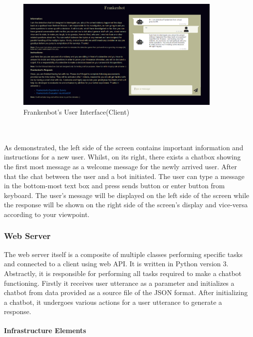 \begin{figure}[!h]
    \centering
    \includegraphics[width=0.9\textwidth]{img/User_Interface.PNG}
    \caption{Frankenbot's User Interface(Client)}
    \label{fig:userInter}
\end{figure}
\\~\\
As demonstrated, the left side of the screen contains important information and instructions for a new user. Whilst, on its right, there exists a chatbox showing the first most message as a welcome message for the newly arrived user. After that the chat between the user and a bot initiated. The user can type a message in the bottom-most text box and press sends button or enter button from keyboard. The user's message will be displayed on the left side of the screen while the response will be shown on the right side of the screen's display and vice-versa according to your viewpoint.

\subsubsection*{Web Server}
The web server itself is a composite of multiple classes performing specific tasks and connected to a client using web API. It is written in Python version 3. Abstractly, it is responsible for performing all tasks required to make a chatbot functioning. Firstly it receives user utterance as a parameter and initializes a chatbot from data provided as a source file of the JSON format. After initializing a chatbot, it undergoes various actions for a user utterance to generate a response.

\paragraph*{Infrastructure Elements}


